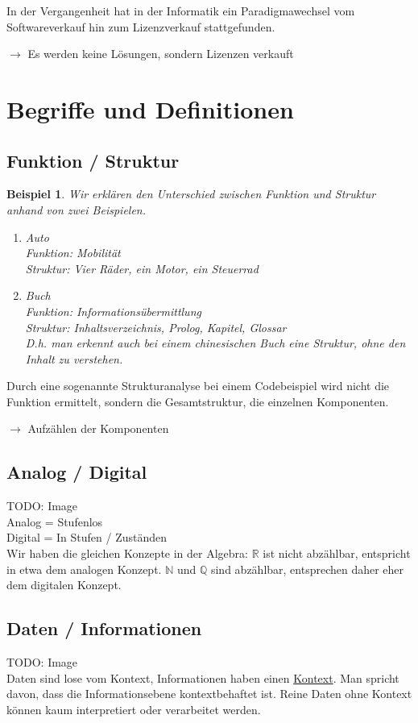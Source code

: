 \documentclass{report}
\newtheorem{myexample}{Beispiel}
\begin{document}
In der Vergangenheit hat in der Informatik ein Paradigmawechsel vom Softwareverkauf hin zum Lizenzverkauf stattgefunden.
\begin{center}$\to$ Es werden keine Lösungen, sondern Lizenzen verkauft\end{center}
\section{Begriffe und Definitionen}
\subsection{Funktion / Struktur}
\begin{myexample}Wir erklären den Unterschied zwischen Funktion und Struktur anhand von zwei Beispielen.
\begin{enumerate}
\item Auto\\
Funktion: Mobilität\\
Struktur: Vier Räder, ein Motor, ein Steuerrad
\item Buch\\
Funktion: Informationsübermittlung\\
Struktur: Inhaltsverzeichnis, Prolog, Kapitel, Glossar\\
D.h. man erkennt auch bei einem chinesischen Buch eine Struktur, ohne den Inhalt zu verstehen.
\end{enumerate}
\end{myexample}
Durch eine sogenannte Strukturanalyse bei einem Codebeispiel wird nicht die Funktion ermittelt, sondern die Gesamtstruktur, die einzelnen Komponenten.
\begin{center}$\to$ Aufzählen der Komponenten\end{center}
\subsection{Analog / Digital}
TODO: Image\\
Analog = Stufenlos\\
Digital = In Stufen / Zuständen\\
Wir haben die gleichen Konzepte in der Algebra: $\mathbb{R}$ ist nicht abzählbar, entspricht in etwa dem analogen Konzept. $\mathbb{N}$ und $\mathbb{Q}$ sind abzählbar, entsprechen daher eher dem digitalen Konzept.
\subsection{Daten / Informationen}
TODO: Image\\
Daten sind lose vom Kontext, Informationen haben einen \underline{Kontext}. Man spricht davon, dass die Informationsebene kontextbehaftet ist. Reine Daten ohne Kontext können kaum interpretiert oder verarbeitet werden.
\end{document}
